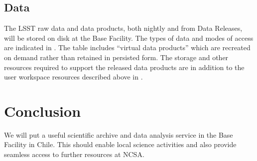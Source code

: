 \subsection{Data}
\label{sec:data}

The LSST raw data and data products, both nightly and from Data Releases, will be stored on disk at the Base Facility.
The types of data and modes of access are indicated in .
The table includes ``virtual data products'' which are recreated on demand rather than retained in persisted form.
The storage and other resources required to support the released data products are in addition to the user workspace resources described above in .




\section{Conclusion}

We will put a useful scientific archive and data analysis service in the Base Facility in Chile.
This should enable local science activities and also provide seamless access to further resources at NCSA.
